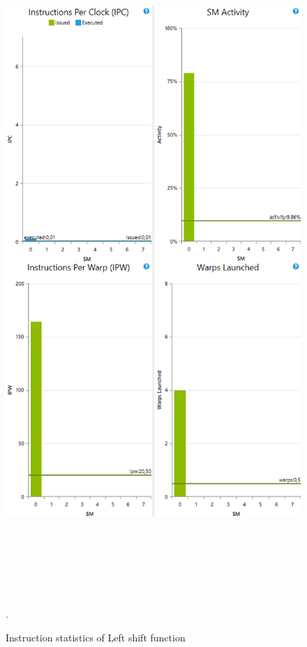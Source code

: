 \documentclass[oneside,openright,12pt,final,en]{mgr}
\begin{document}
\begin{figure}[H]
	\centering
	\includegraphics[width=\textwidth, height=26cm,keepaspectratio]{leftshift_instructions}.
	\caption{Instruction statistics of Left shift function}
	\label{fig:leftshift_instructions}
\end{figure}
\end{document}
